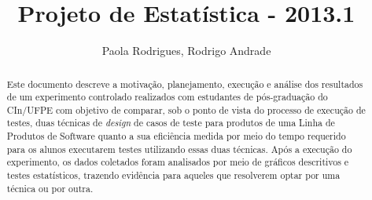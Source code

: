 \documentclass[final,3p,times,twocolumn]{elsarticle}
\begin{document}
\begin{frontmatter}



\title{Projeto de Estat\'istica - 2013.1}


\author{Paola Rodrigues, Rodrigo Andrade}
\address{Centro de Inform\'atica
\\ Universidade Federal de Pernambuco
\\prga,rcaa2@cin.ufpe.br
}

\begin{abstract}
\footnotesize
Este documento descreve a  motivação, planejamento, execução e análise dos resultados de um experimento controlado realizados com estudantes de pós-graduação do CIn/UFPE com objetivo de comparar, sob o ponto de vista do processo de execução de testes, duas técnicas de \emph{design} de casos de teste para produtos de uma Linha de Produtos de Software quanto a sua eficiência medida por meio do tempo requerido para os alunos executarem testes utilizando essas duas técnicas. Após a execução do experimento, os dados coletados foram analisados por meio de gráficos descritivos e testes estatísticos, trazendo evidência para aqueles que resolverem optar por uma técnica ou por outra.

\end{abstract}

\end{frontmatter}


\end{document}
